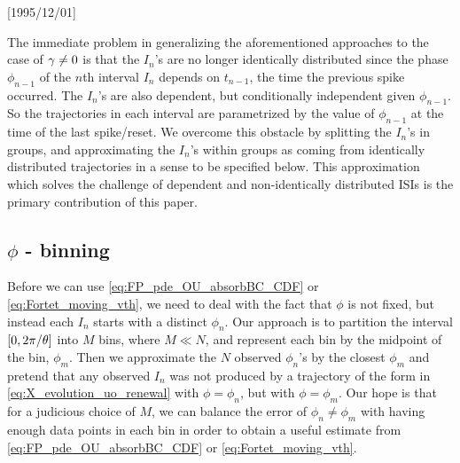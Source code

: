 \NeedsTeXFormat{LaTeX2e}[1995/12/01] \documentclass[10pt]{bmc_article}
\newenvironment{bmcformat}{\begin{raggedright}\baselineskip20pt\sloppy\setboolean{publ}{false}}{\end{raggedright}\baselineskip20pt\sloppy}
\begin{document}
\begin{bmcformat}
The immediate problem in generalizing the aforementioned approaches to the case
of ${\gamma } \neq 0$ is that the $I_n$'s are no longer identically distributed since
the phase $\phi_{n-1}$ of the $n$th interval $I_n$ depends on $t_{n-1}$, the
time the previous spike occurred. The $I_n$'s are also dependent, but conditionally
independent given $\phi_{n-1}$. So the trajectories in each interval are
parametrized by the value of $\phi_{n-1}$ at the time of the last spike/reset.
We overcome this obstacle by splitting the $I_n$'s in groups, and
approximating the $I_n$'s within groups as coming from identically
distributed trajectories in a sense to be specified below. This approximation
which solves the challenge of dependent and non-identically distributed ISIs is
the primary contribution of this paper.

\subsection{$\phi$ - binning}
Before we can use \cref{eq:FP_pde_OU_absorbBC_CDF} or
\eqref{eq:Fortet_moving_vth}, we need to deal with the fact that $\phi$ is not
fixed, but instead each $I_n$ starts with a distinct $\phi_n$. Our approach is
to partition the interval $[0, 2 \pi/{\theta}]$ into $M$ bins, where $M \ll N$, and
represent each bin by the midpoint of the bin, $\phi_m$. Then we approximate the
$N$ observed $\phi_n$'s by the closest $\phi_m$ and pretend that any observed
$I_n$ was not produced by a trajectory of the form in
\cref{eq:X_evolution_uo_renewal} with $\phi = \phi_n$, but with $\phi = \phi_m$.
Our hope is that for a judicious choice of $M$, we can balance the error of
$\phi_n \neq \phi_m$ with having enough data points in each bin in order to
obtain a useful estimate from \cref{eq:FP_pde_OU_absorbBC_CDF} or
\eqref{eq:Fortet_moving_vth}.


\end{bmcformat}
\end{document}
